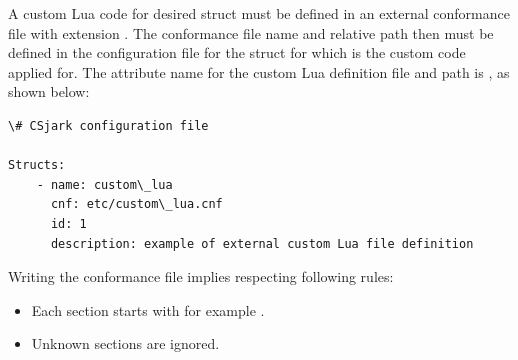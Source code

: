 \documentclass[A4paper,10pt,english]{sphinxmanual}
\begin{document}
A custom Lua code for desired struct must be defined in an external conformance file with extension . The conformance file name and relative path then must be defined in the configuration file for the struct for which is the custom code applied for. The attribute name for the custom Lua definition file and path is , as shown below:

\begin{Verbatim}[commandchars=\\\{\}]
\# CSjark configuration file

Structs:
    - name: custom\_lua
      cnf: etc/custom\_lua.cnf
      id: 1
      description: example of external custom Lua file definition
\end{Verbatim}

Writing the conformance file implies respecting following rules:
\begin{itemize}
\item {} 
Each section starts with  for example .

\item {} 
Unknown sections are ignored.

\end{itemize}
\end{document}
